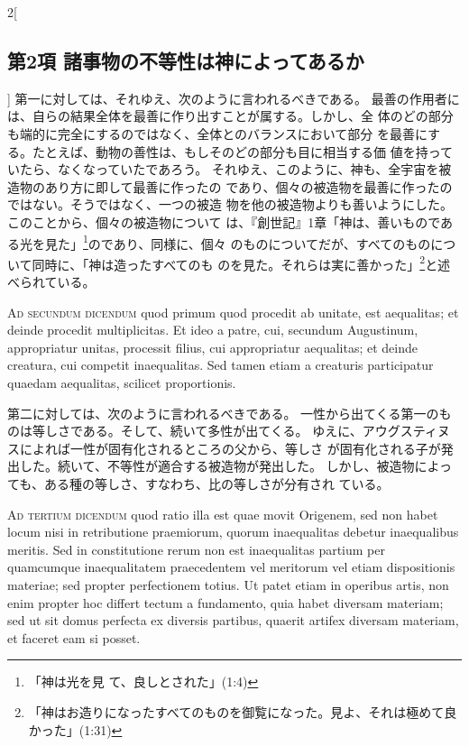 \documentclass[paper=a4paper,fontsize=10pt,jafontsize=9pt,titlepage]{jlreq}
\begin{document}
\begin{paracol}{2}[\subsection{第2項 諸事物の不等性は神によってあるか}]
第一に対しては、それゆえ、次のように言われるべきである。
最善の作用者には、自らの結果全体を最善に作り出すことが属する。しかし、全
 体のどの部分も端的に完全にするのではなく、全体とのバランスにおいて部分
 を最善にする。たとえば、動物の善性は、もしそのどの部分も目に相当する価
 値を持っていたら、なくなっていたであろう。
それゆえ、このように、神も、全宇宙を被造物のあり方に即して最善に作ったの
 であり、個々の被造物を最善に作ったのではない。そうではなく、一つの被造
 物を他の被造物よりも善いようにした。このことから、個々の被造物について
 は、『創世記』1章「神は、善いものである光を見た」\footnote{「神は光を見
 て、良しとされた」(1:4)}のであり、同様に、個々
 のものについてだが、すべてのものについて同時に、「神は造ったすべてのも
 のを見た。それらは実に善かった」\footnote{「神はお造りになったすべてのものを御覧になった。見よ、それは極めて良かった」(1:31)}と述べられている。


\switchcolumn*[\subsection{ad.2}]


{\scshape Ad secundum dicendum} quod primum quod
procedit ab unitate, est aequalitas; et deinde procedit
multiplicitas. Et ideo a patre, cui, secundum Augustinum, appropriatur
unitas, processit filius, cui appropriatur aequalitas; et deinde
creatura, cui competit inaequalitas. Sed tamen etiam a creaturis
participatur quaedam aequalitas, scilicet proportionis.


\switchcolumn


第二に対しては、次のように言われるべきである。
一性から出てくる第一のものは等しさである。そして、続いて多性が出てくる。
ゆえに、アウグスティヌスによれば一性が固有化されるところの父から、等しさ
 が固有化される子が発出した。続いて、不等性が適合する被造物が発出した。
しかし、被造物によっても、ある種の等しさ、すなわち、比の等しさが分有され
 ている。


\switchcolumn*[\subsection{ad.3}]


{\scshape Ad tertium dicendum} quod ratio illa est quae
movit Origenem, sed non habet locum nisi in retributione praemiorum,
quorum inaequalitas debetur inaequalibus meritis. Sed in constitutione
rerum non est inaequalitas partium per quamcumque inaequalitatem
praecedentem vel meritorum vel etiam dispositionis materiae; sed propter
perfectionem totius. Ut patet etiam in operibus artis, non enim propter
hoc differt tectum a fundamento, quia habet diversam materiam; sed ut
sit domus perfecta ex diversis partibus, quaerit artifex diversam
materiam, et faceret eam si posset.



\end{paracol}
\end{document}
